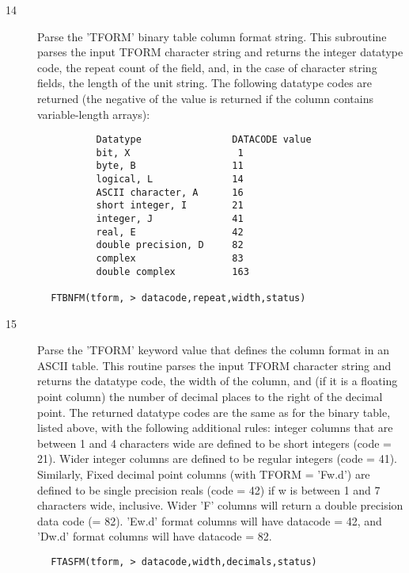 \documentclass[11pt]{book}
\begin{document}
\begin{description}
\item[14] Parse the 'TFORM' binary table column format string.
    This subroutine parses the input TFORM character string and returns the
    integer datatype code, the repeat count of the field, and, in the case
    of character string fields, the length of the unit string.  The following
    datatype codes are returned (the negative of the value is returned
   if the column contains variable-length arrays):
\end{description}

\begin{verbatim}
                Datatype                DATACODE value
                bit, X                   1
                byte, B                 11
                logical, L              14
                ASCII character, A      16
                short integer, I        21
                integer, J              41
                real, E                 42
                double precision, D     82
                complex                 83
                double complex          163

        FTBNFM(tform, > datacode,repeat,width,status)
\end{verbatim}

\begin{description}
\item[15] Parse the 'TFORM' keyword value that defines the column format in
    an ASCII table.  This routine parses the input TFORM character
    string and returns the datatype code, the width of the column,
    and (if it is a floating point column) the number of decimal places
    to the right of the decimal point.  The returned datatype codes are
    the same as for the binary table, listed above, with the following
    additional rules:  integer columns that are between 1 and 4 characters
    wide are defined to be short integers (code = 21).  Wider integer
    columns are defined to be regular integers (code = 41).  Similarly,
    Fixed decimal point columns (with TFORM = 'Fw.d') are defined to
    be single precision reals (code = 42) if w is between 1 and 7 characters
    wide, inclusive.  Wider 'F' columns will return a double precision
    data code (= 82).  'Ew.d' format columns will have datacode = 42,
   and 'Dw.d' format columns will have datacode = 82.
\end{description}

\begin{verbatim}
        FTASFM(tform, > datacode,width,decimals,status)
\end{verbatim}
\end{document}
